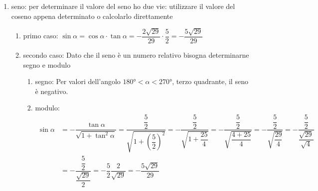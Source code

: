 \begin{table}[H]
\begin{enumerate}
\begin{enumerate}
\begin{enumerate}
		\end{enumerate}
		\item seno: per determinare il valore del seno ho due vie: utilizzare il valore del coseno appena determinato o calcolarlo direttamente 
		\begin{enumerate}
			\item primo caso: $\sin\alpha=\cos\alpha\cdot\tan\alpha=-\dfrac{2\sqrt{29}}{29}\cdot\dfrac{5}{2}=-\dfrac{5\sqrt{29}}{29}$
			\item secondo caso: Dato che il seno è un numero relativo bisogna determinarne segno e modulo
			\begin{enumerate}
				\item segno:  Per valori dell'angolo  $\ang{180}<\alpha<\ang{270}$, terzo quadrante, il seno è negativo.
				\item modulo:
				\begin{align*}
				\sin\alpha&=-\dfrac{\tan\alpha}{\sqrt{1+\tan^2\alpha}}
				=\dfrac{\dfrac{5}{2}}{\sqrt{1+\left(\dfrac{5}{2}\right)^2}}
				=-\dfrac{\dfrac{5}{2}}{\sqrt{1+\dfrac{25}{4}}}
				=-\dfrac{\dfrac{5}{2}}{\sqrt{\dfrac{4+25}{4}}}
				=-\dfrac{\dfrac{5}{2}}{\sqrt{\dfrac{29}{4}}}
				=-\dfrac{\dfrac{5}{2}}{\dfrac{\sqrt{29}}{\sqrt{4}}}\\
				&=-\dfrac{\dfrac{5}{2}}{\dfrac{\sqrt{29}}{2}}
				=-\dfrac{5}{2}\dfrac{2}{\sqrt{29}}
				=-\dfrac{5\sqrt{29}}{29}
				\end{align*} %
			\end{enumerate}
		\end{enumerate}
	\end{enumerate}
\end{enumerate}
\end{table}


